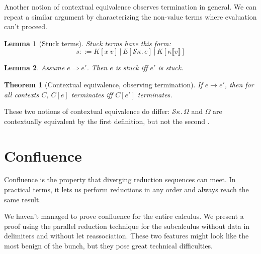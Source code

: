 \documentclass[a4paper, 11pt,titlepage, openright, twoside]{report}
\newcommand{\Int}{\Rightarrow}
\newcommand{\keyword}[1]{\textsf{\textup{#1}}}
\newcommand{\KwLet}{\keyword{let}}
\renewcommand{\S}{\mathcal{S}}
\newcommand{\+}{\enspace}
\newtheorem{lemma}{Lemma}
\newtheorem{theorem}{Theorem}
\begin{document}
Another notion of contextual equivalence observes termination in general.
We can repeat a similar argument by characterizing the non-value terms
where evaluation can't proceed.

\begin{lemma}[Stuck terms]
	Stuck terms have this form:
	$$s ::= K[x\:v] │ E[\S κ.\,e] │ K[κ⟦v⟧]$$
\end{lemma}
\begin{lemma} Assume $e \Int e'$. Then $e$ is stuck iff $e'$ is stuck.
\end{lemma}

\begin{theorem}[Contextual equivalence, observing termination]
	If $e → e'$, then for all contexts $C$, $C[e]$ terminates iff $C[e']$ terminates.
\end{theorem}

These two notions of contextual equivalence do differ:
$\S κ.\,Ω$ and $Ω$ are contextually equivalent by the first definition,
but not the second \cite{bisim}.



\chapter{Confluence}
Confluence is the property
that diverging reduction sequences can meet.
In practical terms, it lets us perform reductions in any order
and always reach the same result.

We haven't managed to prove confluence for
the entire calculus.
We present a proof using the parallel reduction technique for the subcalculus without
data in delimiters and without \KwLet{} reassociation.
These two features might look like the most benign of the bunch,
but they pose great technical difficulties.
\end{document}
